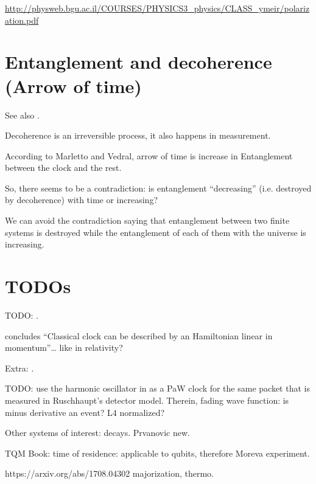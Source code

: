\url{http://physweb.bgu.ac.il/COURSES/PHYSICS3_physics/CLASS_ymeir/polarization.pdf}

\section{Entanglement and decoherence (Arrow of time)}
See also \cite{EntanglementVsDecoherence}.

Decoherence is an irreversible process, it also happens in measurement.

According to Marletto and Vedral, arrow of time is increase in Entanglement
between the clock and the rest.

So, there seems to be a contradiction: is entanglement ``decreasing''
(i.e. destroyed by decoherence) with time
or increasing?

We can avoid the contradiction saying that
entanglement between two finite systems is
destroyed while the entanglement of each of them with the universe
is increasing.

\fi

\iftodo
\section{TODOs}

TODO: \cite{RealisticClocks}.

\cite{HarmonicClocks} concludes ``Classical clock can be described by an Hamiltonian linear in momentum''\dots
like in relativity?

Extra: \cite{TimeAnyons}.

TODO: use the harmonic oscillator in \cite{HarmonicClocks}
as a PaW clock for the same packet that is measured in
Ruschhaupt's detector model.
Therein, fading wave function: is minus derivative an event?
L4 normalized?

Other systems of interest: decays. Prvanovic new.

TQM Book: time of residence: applicable to qubits, therefore Moreva experiment.

https://arxiv.org/abs/1708.04302 majorization, thermo.

\fi

